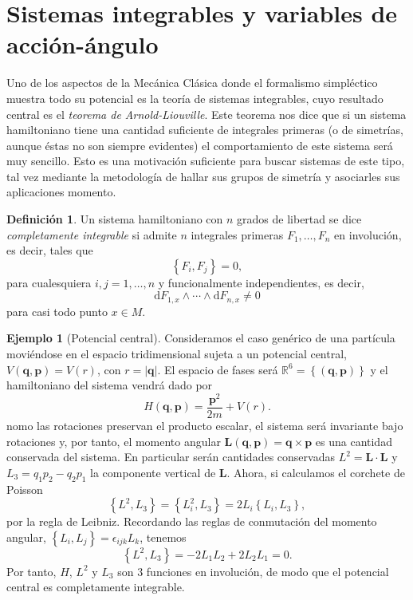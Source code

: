 \documentclass[12pt,a4paper,twoside]{article}
\theoremstyle{definition} \newtheorem{defn}[thm]{Definición}
\theoremstyle{definition} \newtheorem{ejemplo}[thm]{Ejemplo}
\theoremstyle{definition} \newtheorem{ejercicio}[thm]{Ejercicio}
\theoremstyle{remark} \newtheorem*{obs}{Observación}
\def\RR{\mathbb{R}}
\def\dd{\mathrm{d}}
\newcommand{\vect}[1]{\mathbf{#1}}
\newcommand{\pois}[2]{\left\lbrace#1,#2\right\rbrace}
\begin{document}
  \section{Sistemas integrables y variables de acción-ángulo}

  Uno de los aspectos de la Mecánica Clásica donde el formalismo simpléctico muestra todo su potencial es la teoría de sistemas integrables, cuyo resultado central es el \emph{teorema de Arnold-Liouville}.
  Este teorema nos dice que si un sistema hamiltoniano tiene una cantidad suficiente de integrales primeras (o de simetrías, aunque éstas no son siempre evidentes) el comportamiento de este sistema será muy sencillo. Esto es una motivación suficiente para buscar sistemas de este tipo, tal vez mediante la metodología de hallar sus grupos de simetría y asociarles sus aplicaciones momento.

  \begin{defn}
    Un sistema hamiltoniano con $n$ grados de libertad se dice \emph{completamente integrable} si admite $n$ integrales primeras $F_1,\dots,F_n$ en involución, es decir, tales que
    \begin{equation}
      \left\{ F_i,F_j \right\}=0,  
    \end{equation}
    para cualesquiera $i,j=1,\dots,n$ y funcionalmente independientes, es decir,
    \begin{equation}
      \dd F_{1,x} \wedge \cdots \wedge \dd F_{n,x}\neq 0
    \end{equation}
    para casi todo punto $x\in M$.
  \end{defn}

  \begin{ejemplo}[Potencial central]
    Consideramos el caso genérico de una partícula moviéndose en el espacio tridimensional sujeta a un potencial central, $V(\vect{q},\vect{p})=V(r)$, con $r=|\vect{q}|$. El espacio de fases será $\RR^6=\left\{ (\vect{q},\vect{p}) \right\}$ y el hamiltoniano del sistema vendrá dado por
    \begin{equation}
      H(\vect{q},\vect{p})=\frac{\vect{p}^2}{2m}+V(r).
      \label{eq:central}
    \end{equation}
    nomo las rotaciones preservan el producto escalar, el sistema será invariante bajo rotaciones y, por tanto, el momento angular $\vect{L}(\vect{q},\vect{p})=\vect{q}\times \vect{p}$ es una cantidad conservada del sistema. En particular serán cantidades conservadas $L^2=\vect{L}\cdot \vect{L}$ y $L_3=q_1p_2-q_2p_1$ la componente vertical de $\vect{L}$. Ahora, si calculamos el corchete de Poisson
  \begin{equation*}
    \pois{L^2}{L_3}=\pois{L_i^2}{L_3}=2L_i\pois{L_i}{L_3},
  \end{equation*}
  por la regla de Leibniz. Recordando las reglas de conmutación del momento angular, $\left\{ L_i,L_j \right\}=\epsilon_{ijk}L_k$, tenemos
\begin{equation*}
  \pois{L^2}{L_3}=-2L_1L_2+2L_2L_1=0.
\end{equation*}
Por tanto, $H$, $L^2$ y $L_3$ son $3$ funciones en involución, de modo que el potencial central es completamente integrable.
  \end{ejemplo}
\end{document}
